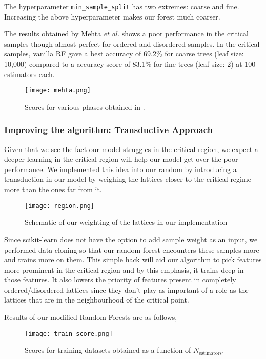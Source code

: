 The hyperparameter \texttt{min\_sample\_split} has two extremes: coarse and fine.
Increasing the above hyperparameter makes our forest much coarser.

The results obtained by Mehta \emph{et al.} \cite{2019} shows a poor performance in the critical samples though almost perfect for ordered and disordered samples. In the critical samples, vanilla RF gave a best accuracy of 69.2\% for coarse trees (leaf size: 10,000) compared to a accuracy score of 83.1\% for fine trees (leaf size: 2) at 100 estimators each.

\begin{figure}[h!]
    \centering
    \texttt{[image: mehta.png]}
    \caption{Scores for various phases obtained in \cite{2019}.}
\end{figure}


\subsubsection{Improving the algorithm: Transductive Approach}
Given that we see the fact our model struggles in the critical region, we expect a deeper learning in the critical region will help our model get over the poor performance.
We implemented this idea into our random by introducing a transduction in our model by weighing the lattices closer to the critical regime more than the ones far from it.

\begin{figure}[H]
    \centering
    \texttt{[image: region.png]}
    \caption{Schematic of our weighting of the lattices in our implementation}
\end{figure}

Since scikit-learn does not have the option to add sample weight as an input, we performed data cloning so that our random forest encounters these samples more and trains more on them. This simple hack will aid our algorithm to pick features more prominent in the critical region and by this emphasis, it trains deep in those features. It also lowers the priority of features present in completely ordered/disordered lattices since they don’t play as important of a role as the lattices that are in the neighbourhood of the critical point.

Results of our modified Random Forests are as follows,

\begin{figure}[h!]
    \centering
    \texttt{[image: train-score.png]}
    \caption{Scores for training datasets obtained as a function of \( N_{\text{estimators}} \).}
\end{figure}

